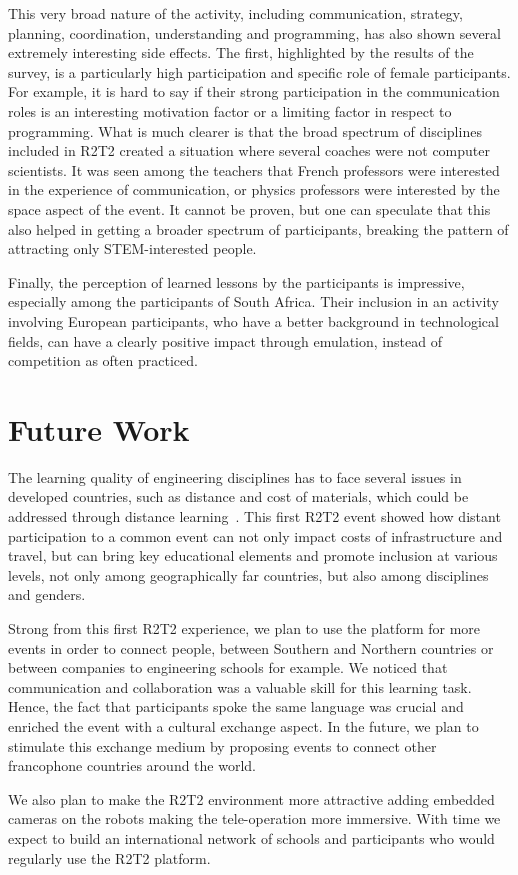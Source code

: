 \documentclass{intech-journal}
\begin{document}
This very broad nature of the activity, including communication, strategy, planning, coordination, understanding and programming, has also shown several extremely interesting side effects.
The first, highlighted by the results of the survey, is a particularly high participation and specific role of female participants.
For example, it is hard to say if their strong participation in the communication roles is an interesting motivation factor or a limiting factor in respect to programming. 
What is much clearer is that the broad spectrum of disciplines included in R2T2 created a situation where several coaches were not computer scientists. 
It was seen among the teachers that French professors were interested in the experience of communication, or physics professors were interested by the space aspect of the event. 
It cannot be proven, but one can speculate that this also helped in getting a broader spectrum of participants, breaking the pattern of attracting only STEM-interested people.

Finally, the perception of learned lessons by the participants is impressive, especially among the participants of South Africa.
Their inclusion in an activity involving European participants, who have a better background in technological fields, can have a clearly positive impact through emulation, instead of competition as often practiced. 

\section{Future Work}
The learning quality of engineering disciplines has to face several issues in developed countries, such as distance and cost of materials, which could be addressed through distance learning~\cite{winthrop2012new}. 
This first R2T2 event showed how distant participation to a common event can not only impact costs of infrastructure and travel, but can bring key educational elements and promote inclusion at various levels, not only among geographically far countries, but also among disciplines and genders.

Strong from this first R2T2 experience, we plan to use the platform for more events in order to connect people, between Southern and Northern countries or between companies to engineering schools for example. 
We noticed that communication and collaboration was a valuable skill for this learning task. Hence, the fact that participants spoke the same language was crucial and enriched the event with a cultural exchange aspect.
In the future, we plan to stimulate this exchange medium by proposing events to connect other francophone countries around the world. 

We also plan to make the R2T2 environment more attractive adding embedded cameras on the robots making the tele-operation more immersive. 
With time we expect to build an international network of schools and participants who would regularly use the R2T2 platform. 
\small
{}
\end{document}
